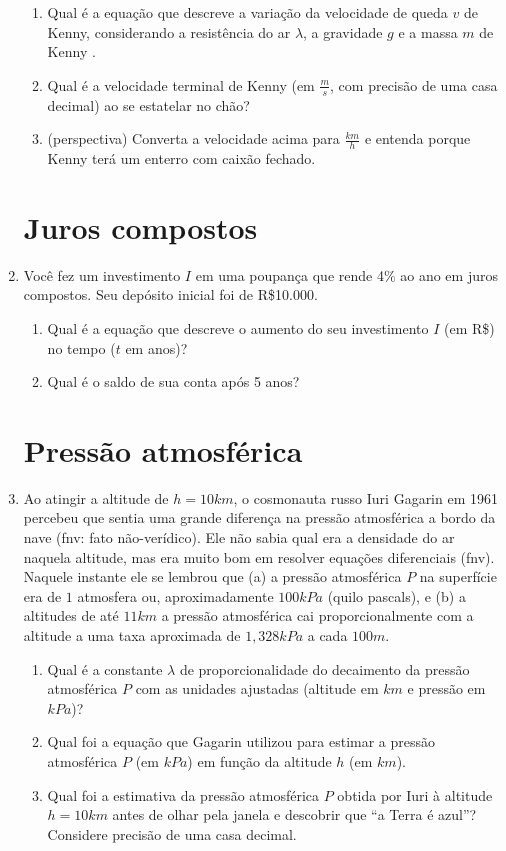 \documentclass[a4paper]{article}
\begin{document}
\begin{enumerate}
  \begin{enumerate}
  \item Qual é a equação que descreve a variação da velocidade de
    queda $v$ de Kenny, considerando a resistência do ar $\lambda$, a
    gravidade $g$ e a massa $m$ de Kenny \cite{PLT}.
  \item Qual é a velocidade terminal de Kenny (em $\frac{m}{s}$, com
    precisão de uma casa decimal) ao se estatelar no chão?
  \item (perspectiva) Converta a velocidade acima para $\frac{km}{h}$
    e entenda porque Kenny terá um enterro com caixão fechado.
  \end{enumerate}

\section{Juros compostos}

\item Você fez um investimento $I$ em uma poupança que rende 4\% ao
  ano em juros compostos. Seu depósito inicial foi de R\$10.000.

  \begin{enumerate}
  \item Qual é a equação que descreve o aumento do seu investimento
    $I$ (em R\$) no tempo ($t$ em anos)?
  \item Qual é o saldo de sua conta após 5 anos?
  \end{enumerate}

\section{Pressão atmosférica}

\item Ao atingir a altitude de $h=10km$, o cosmonauta russo Iuri
  Gagarin em 1961 percebeu que sentia uma grande diferença na pressão
  atmosférica a bordo da nave (fnv: fato não-verídico). Ele não sabia
  qual era a densidade do ar naquela altitude, mas era muito bom em
  resolver equações diferenciais (fnv). Naquele instante ele se
  lembrou que (a) a pressão atmosférica $P$ na superfície era de $1$
  atmosfera ou, aproximadamente $100kPa$ (quilo pascals), e (b) a
  altitudes de até $11km$ a pressão atmosférica cai proporcionalmente
  com a altitude a uma taxa aproximada de $1,328kPa$ a cada
  $100m$. %

  \begin{enumerate}
  \item Qual é a constante $\lambda$ de proporcionalidade do
    decaimento da pressão atmosférica $P$ com as unidades ajustadas
    (altitude em $km$ e pressão em $kPa$)?
  \item Qual foi a equação que Gagarin utilizou para estimar a pressão
    atmosférica $P$ (em $kPa$) em função da altitude $h$ (em $km$).
  \item Qual foi a estimativa da pressão atmosférica $P$ obtida por
    Iuri à altitude $h=10km$ antes de olhar pela janela e descobrir
    que ``a Terra é azul''? Considere precisão de uma casa decimal.
  \end{enumerate}


\end{enumerate}
\end{document}
